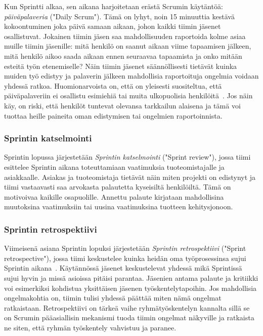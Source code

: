 \documentclass[finnish]{../tktltiki2}
\theoremstyle{definition}
\theoremstyle{remark}
\begin{document}
Kun Sprintti alkaa, sen aikana harjoitetaan erästä Scrumin käytäntöä:
\emph{päiväpalaveria} ("Daily Scrum"). Tämä on lyhyt, noin 15 minuuttia kestävä kokoontuminen joka päivä samaan aikaan, johon
kaikki tiimin jäsenet osallistuvat. Jokainen tiimin jäsen saa
mahdollisuuden raportoida kolme asiaa muille tiimin jäsenille:
mitä henkilö on saanut aikaan viime tapaamisen jälkeen, mitä henkilö
aikoo saada aikaan ennen seuraavaa tapaamista ja onko mitään
esteitä työn etenemiselle? Näin tiimin jäsenet säännöllisesti tietävät
kuinka muiden työ edistyy ja palaverin jälkeen mahdollisia raportoituja
ongelmia voidaan yhdessä ratkoa. Huomionarvoista on, että on yleisesti
suositeltua, että päiväpalaveriin ei osallistu esimiehiä tai muita
ulkopuolisia henkilöitä~\cite{ScrumHandBook}. Jos näin käy, on riski,
että henkilöt tuntevat olevansa tarkkailun alaisena ja tämä voi
tuottaa heille paineita oman edistymisen tai ongelmien raportoinnista.

\subsubsection{Sprintin katselmointi}

Sprintin lopussa järjestetään \emph{Sprintin katselmointi} ("Sprint review"), jossa tiimi esittelee Sprintin aikana toteuttamiaan
vaatimuksia tuoteomistajalle ja asiakkaalle. Asiakas ja tuoteomistaja
tietävät näin miten projekti on edistynyt ja tiimi vastaavasti saa
arvokasta palautetta kyseisiltä henkilöiltä. Tämä on motivoivaa
kaikille osapuolille. Annettu palaute kirjataan mahdollisina muutoksina
vaatimuksiin tai uusina vaatimuksina tuotteen kehitysjonoon.

\subsubsection{Sprintin retrospektiivi}

Viimeisenä asiana Sprintin lopuksi järjestetään \emph{Sprintin retrospektiivi}
("Sprint retrospective"), jossa tiimi keskustelee kuinka heidän
oma työprosessinsa sujui Sprintin aikana~\cite{Scrumprimer}. Käytännössä jäsenet
keskustelevat yhdessä mikä Sprintissä sujui hyvin ja missä
asioissa pitäisi parantaa. Jäsenien antama palaute ja kritiikki
voi esimerkiksi kohdistua yksittäisen jäsenen työskentelytapoihin.
Jos mahdollisia ongelmakohtia on, tiimin tulisi yhdessä päättää
miten nämä ongelmat ratkaistaan. Retrospektiivi on tärkeä vaihe
ryhmätyöskentelyn kannalta sillä se on Scrumin pääasiallisin
mekanismi tuoda tiimin ongelmat näkyville ja ratkaista ne siten,
että ryhmän työskentely vahvistuu ja paranee.\\
\end{document}
